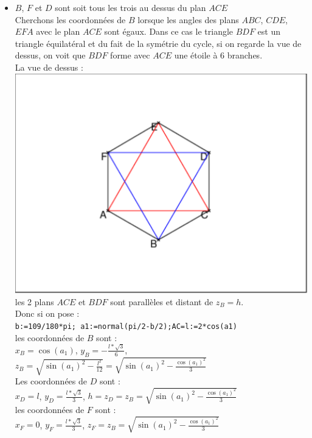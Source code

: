 \documentclass[a4paper,11pt]{book}
\begin{document}
\begin{itemize}
\item $B$, $F$ et $D$ sont soit tous les trois au dessus du plan $ACE$\\
Cherchons les coordonn\'ees de $B$ lorsque les angles des plans $ABC$, 
$CDE$, $EFA$ avec le plan $ACE$ sont \'egaux. Dans ce cas le triangle $BDF$ est
un triangle \'equilat\'eral et du fait de la sym\'etrie du cycle, si on regarde 
la vue de dessus, on voit que $BDF$ forme avec $ACE$ une \'etoile \`a 6 
branches.\\
La vue de dessus :\\
\includegraphics[width=\textwidth]{cyclohex2}
les 2 plans 
$ACE$ et $BDF$ sont parall\`eles et distant de $z_B=h$.\\
Donc si on pose :\\
{\tt b:=109/180*pi; a1:=normal(pi/2-b/2);AC=l:=2*cos(a1)}\\
les coordonn\'ees de $B$ sont :\\
$x_B=\cos(a_1)$, $\displaystyle y_B=-\frac{l*\sqrt 3}{6}$, 
$\displaystyle z_B=\sqrt{\sin(a_1)^2-\frac{l^2}{12}}=\sqrt{\sin(a_1)^2-\frac{\cos(a_1)^2}{3}}$\\
Les coordonn\'ees de $D$ sont :\\
$x_D=l$, $\displaystyle y_D=\frac{l*\sqrt 3}{3}$, 
$\displaystyle h=z_D=z_B=\sqrt{\sin(a_1)^2-\frac{\cos(a_1)^2}{3}}$\\
les coordonn\'ees de $F$ sont :\\
$x_F=0$, $\displaystyle y_F=\frac{l*\sqrt 3}{3}$, 
$\displaystyle z_F=z_B=\sqrt{\sin(a_1)^2-\frac{\cos(a_1)^2}{3}}$\\

\end{itemize}
\end{document}
